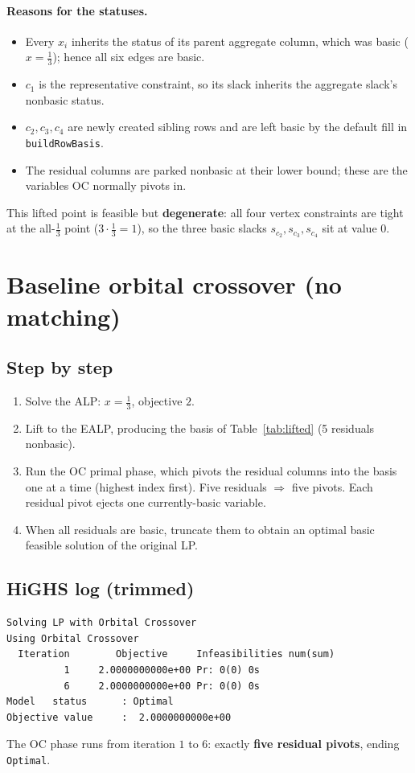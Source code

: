 \documentclass[11pt]{article}
\newcommand{\slack}[1]{s_{#1}}
\begin{document}
\paragraph{Reasons for the statuses.}
\begin{itemize}[nosep]
  \item Every $x_i$ inherits the status of its parent aggregate column, which was
  basic ($x=\tfrac13$); hence all six edges are basic.
  \item $c_1$ is the representative constraint, so its slack inherits the
  aggregate slack's nonbasic status.
  \item $c_2,c_3,c_4$ are newly created sibling rows and are left basic by the
  default fill in \texttt{buildRowBasis}.
  \item The residual columns are parked nonbasic at their lower bound; these are
  the variables OC normally pivots in.
\end{itemize}
This lifted point is feasible but \textbf{degenerate}: all four vertex
constraints are tight at the all-$\tfrac13$ point ($3\cdot\tfrac13=1$), so the
three basic slacks $\slack{c_2},\slack{c_3},\slack{c_4}$ sit at value $0$.

\section{Baseline orbital crossover (no matching)}

\subsection*{Step by step}
\begin{enumerate}[nosep]
  \item Solve the ALP: $x=\tfrac13$, objective $2$.
  \item Lift to the EALP, producing the basis of Table~\ref{tab:lifted}
        (5 residuals nonbasic).
  \item Run the OC primal phase, which pivots the residual columns into the basis
        one at a time (highest index first). Five residuals $\Rightarrow$ five
        pivots. Each residual pivot ejects one currently-basic variable.
  \item When all residuals are basic, truncate them to obtain an optimal basic
        feasible solution of the original LP.
\end{enumerate}

\subsection*{HiGHS log (trimmed)}
\begin{verbatim}
Solving LP with Orbital Crossover
Using Orbital Crossover
  Iteration        Objective     Infeasibilities num(sum)
          1     2.0000000000e+00 Pr: 0(0) 0s
          6     2.0000000000e+00 Pr: 0(0) 0s
Model   status      : Optimal
Objective value     :  2.0000000000e+00
\end{verbatim}
The OC phase runs from iteration $1$ to $6$: exactly \textbf{five residual
pivots}, ending \texttt{Optimal}.
\end{document}
